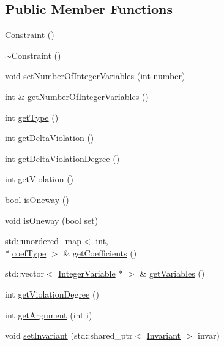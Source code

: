 \subsection*{Public Member Functions}
\begin{DoxyCompactItemize}
\item 
\hyperlink{class_constraint_ac066210c674e540f0d2570f53d6eff7b}{Constraint} ()
\item 
\hyperlink{class_constraint_ae827fc88061ee544aca1cbe95a2c8389}{$\sim$\-Constraint} ()
\item 
void \hyperlink{class_constraint_a8feacaf03b5c6eae9058a9e20c99a829}{set\-Number\-Of\-Integer\-Variables} (int number)
\item 
int \& \hyperlink{class_constraint_a9638dcea0347e70974e9626d40ae651d}{get\-Number\-Of\-Integer\-Variables} ()
\item 
int \hyperlink{class_constraint_ac4dceb32e2f1b32b21503fb84a08026b}{get\-Type} ()
\item 
int \hyperlink{class_constraint_a357eac2af547bcc97ee202ea1b31589f}{get\-Delta\-Violation} ()
\item 
int \hyperlink{class_constraint_a77e02f7d1c968c170b20c44267be4d38}{get\-Delta\-Violation\-Degree} ()
\item 
int \hyperlink{class_constraint_a24d51a877159072275bd0b3eff9c3c86}{get\-Violation} ()
\item 
bool \hyperlink{class_constraint_aeeb7a31a623b2d875ca95c6cf9b5285f}{is\-Oneway} ()
\item 
void \hyperlink{class_constraint_a3d9519a131e3c36db21c589b8853a951}{is\-Oneway} (bool set)
\item 
std\-::unordered\-\_\-map$<$ int, \\*
\hyperlink{_constants_8hpp_a08c47c54ab9fb1545c341ec853cc2278}{coef\-Type} $>$ \& \hyperlink{class_constraint_a0b21be8f860e6daf62f465d9d7a090d8}{get\-Coefficients} ()
\item 
std\-::vector$<$ \hyperlink{class_integer_variable}{Integer\-Variable} $\ast$ $>$ \& \hyperlink{class_constraint_a699d1978b4903587950c9d7a0038bf37}{get\-Variables} ()
\item 
int \hyperlink{class_constraint_a4f98d1e3e4a24652dcd0c13f6b217cc8}{get\-Violation\-Degree} ()
\item 
int \hyperlink{class_constraint_a7db789c2e9f909d8e9ea8770a2b36b4d}{get\-Argument} (int i)
\item 
void \hyperlink{class_constraint_a92aa3050acb0fe8fca68bb0a00c472ec}{set\-Invariant} (std\-::shared\-\_\-ptr$<$ \hyperlink{class_invariant}{Invariant} $>$ invar)

\end{DoxyCompactItemize}
